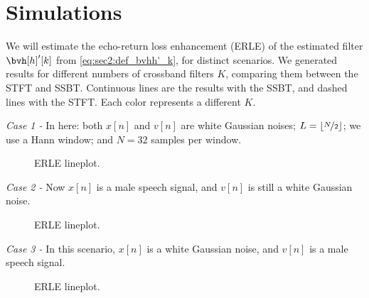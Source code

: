 
\section{Simulations}

We will estimate the echo-return loss enhancement (ERLE) of the estimated filter $\bvh[h]'[k]$ from \cref{eq:sec2:def_bvhh'_k}, for distinct scenarios. We generated results for different numbers of crossband filters $K$, comparing them between the STFT and SSBT. Continuous lines are the results with the SSBT, and dashed lines with the STFT. Each color represents a different $K$.

\noindent\textit{Case 1 -} In here: both $x[n]$ and $v[n]$ are white Gaussian noises; $L = \left\lfloor \nicefrac{N}{2} \right\rfloor$; we use a Hann window; and $N = 32$ samples per window.

\begin{figure}[H]
	\centering
	
	\caption{ERLE lineplot.}
	\label{fig:sec4:lineplot_erle_case1}
\end{figure}

%

\noindent\textit{Case 2 -} Now $x[n]$ is a male speech signal, and $v[n]$ is still a white Gaussian noise.

\begin{figure}[H]
	\centering
	
	\caption{ERLE lineplot.}
	\label{fig:sec4:lineplot_erle_case2}
\end{figure}

\noindent\textit{Case 3 -} In this scenario, $x[n]$ is a white Gaussian noise, and $v[n]$ is a male speech signal.

\begin{figure}[H]
	\centering
	
	\caption{ERLE lineplot.}
	\label{fig:sec4:lineplot_erle_case3}
\end{figure}

